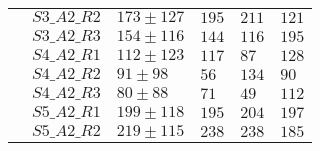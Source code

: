 \begin{table}[H]
\begin{tabular}{|l|l|l|l|l|l|}
                                                                                               & $S3\_A2\_R2$                             & $173 \pm 127$                                                                                & $195$                                  & $211$                                  & $121$                                  \\ \cline{2-6} 
                                                                                               & $S3\_A2\_R3$                             & $154 \pm 116$                                                                                & $144$                                  & $116$                                  & $195$                                  \\ \cline{2-6} 
                                                                                               & $S4\_A2\_R1$                             & $112 \pm 123$                                                                                & $117$                                  & $87$                                   & $128$                                  \\ \cline{2-6} 
                                                                                               & $S4\_A2\_R2$                             & $91 \pm 98$                                                                                  & $56$                                   & $134$                                  & $90$                                   \\ \cline{2-6} 
                                                                                               & $S4\_A2\_R3$                             & $80 \pm 88$                                                                                  & $71$                                   & $49$                                   & $112$                                  \\ \cline{2-6} 
                                                                                               & $S5\_A2\_R1$                             & $199 \pm 118$                                                                                & $195$                                  & $204$                                  & $197$                                  \\ \cline{2-6} 
                                                                                               & $S5\_A2\_R2$                             & $219 \pm 115$                                                                                & $238$                                  & $238$                                  & $185$                                  \\ \hline

\end{tabular}
\end{table}
